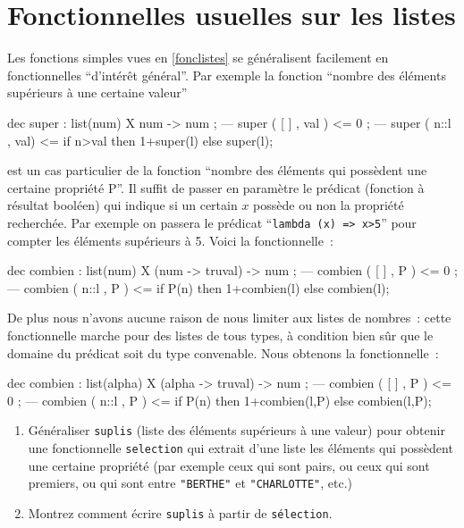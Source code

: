 \section{Fonctionnelles usuelles sur les listes}

Les fonctions simples vues en \ref{fonclistes} se généralisent
facilement en fonctionnelles ``d'intér\^et général''. Par exemple la
fonction ``nombre des éléments supérieurs à une certaine valeur''
\begin{verbatimtab}
dec super : list(num) X num -> num ;
--- super ( [ ] , val ) <= 0 ;
--- super ( n::l , val) <= if n>val 	then 1+super(l) 
					else super(l);
\end{verbatimtab}
est un cas particulier de la fonction ``nombre des éléments qui
possèdent une certaine propriété P''. Il suffit de passer en paramètre
le prédicat (fonction à résultat booléen) qui indique si un certain $x$
possède ou non la propriété recherchée. Par exemple on passera le
prédicat ``\verb+lambda (x) => x>5+'' 
pour compter les éléments supérieurs à 5. Voici la fonctionnelle~:
\begin{verbatimtab}
dec combien : list(num) X (num -> truval) -> num ;
--- combien ( [ ] , P ) <= 0 ;
--- combien ( n::l , P ) <= if P(n) 	
                            then 1+combien(l) 
		  	     else combien(l);
\end{verbatimtab}
De plus nous n'avons aucune raison de nous limiter aux listes de
nombres~: cette fonctionnelle marche pour des listes de tous types, à
condition bien s\^ur que le domaine du prédicat soit du type
convenable. Nous obtenons la fonctionnelle~:
\begin{verbatimtab}
dec combien : list(alpha) X (alpha -> truval) -> num ;
--- combien ( [ ] , P ) <= 0 ;
--- combien ( n::l , P ) <= if P(n) 	
                            then 1+combien(l,P) 
			    else combien(l,P);
\end{verbatimtab}

\begin{exercice}

\begin{enumerate}
\item Généraliser \texttt{suplis} (liste des
éléments supérieurs à une valeur) pour obtenir une fonctionnelle
\texttt{selection} qui extrait d'une liste les éléments qui
  possèdent une certaine propriété (par exemple ceux qui sont pairs,
  ou ceux qui sont premiers, ou qui sont entre \texttt{"BERTHE"} et
  \texttt{"CHARLOTTE"}, etc.)
\item
 Montrez comment écrire \texttt{suplis} à partir de \texttt{sélection}.
\end{enumerate}
\end{exercice}


